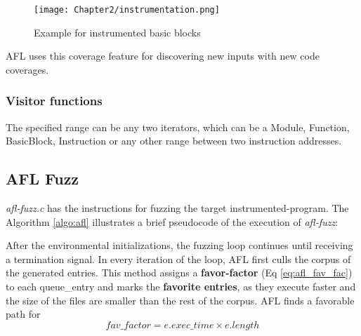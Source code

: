 \begin{figure}[htpb]
    \texttt{[image: Chapter2/instrumentation.png]}
    \centering
    \captionsetup{justification=centering}
    \caption{Example for instrumented basic blocks}
    \label{fig:instrumentation}
\end{figure}

AFL uses this coverage feature for discovering new inputs with new code coverages.

\subsubsection*{Visitor functions}




The specified range can be any two iterators, which can be a Module, Function, BasicBlock, Instruction or any other range between two instruction addresses.

\subsection{AFL Fuzz}

\textit{afl-fuzz.c} has the instructions for fuzzing the target instrumented-program. The Algorithm \ref{algo:afl} illustrates a brief pseudocode of the execution of \textit{afl-fuzz}:



After the environmental initializations, the fuzzing loop continues until receiving a termination signal. In every iteration of the loop, AFL first culls the corpus of the generated entries. This method assigns a \textbf{favor-factor} (Eq \ref{eq:afl_fav_fac}) to each queue\_entry and marks the \textbf{favorite entries}, as they execute faster and the size of the files are smaller than the rest of the corpus. AFL finds a favorable path for  \cite{afl_git} 
\begin{equation}
    fav\_factor = e.exec\_time \times e.length
    \label{eq:afl_fav_fac}
\end{equation}

